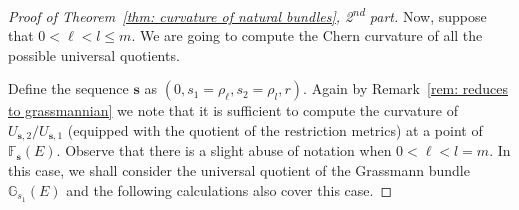 \documentclass[a4paper]{amsart}
\theoremstyle{plain}%
\theoremstyle{definition}
\theoremstyle{remark}
\newcommand{\GG}{\mathbb{G}}
\newcommand{\FF}{\mathbb{F}}
\begin{document}
\begin{proof}[Proof of Theorem~\ref{thm: curvature of natural bundles}, 2\textsuperscript{nd} part]
	Now, suppose that $ 0 < \ell < l \le m $.
	We are going to compute the Chern curvature of all the possible universal quotients.
	
	Define the sequence $ \mathbf{s} $ as $ (0,s_1=\rho_{\ell},s_2=\rho_{l},r) $.
	Again by Remark~\ref{rem: reduces to grassmannian} we note that it is sufficient to compute the curvature of $ U_{\mathbf{s},2} / U_{\mathbf{s},1} $ (equipped with the quotient of the restriction metrics) at a point of $ \FF_{\mathbf{s}}(E) $.
	Observe that there is a slight abuse of notation when $ 0 < \ell < l = m $.
	In this case, we shall consider the universal quotient of the Grassmann bundle $ \GG_{s_1}(E) $ and the following calculations also cover this case.
	

\end{proof}
\end{document}
